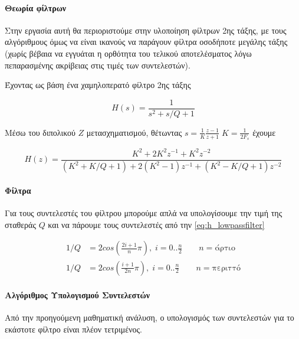 \documentclass{article}
\begin{document}
\paragraph{Θεωρία  φίλτρων}

Στην εργασία αυτή θα περιοριστούμε στην υλοποίηση φίλτρων 2ης τάξης, με τους 
αλγόριθμους όμως να είναι ικανούς να παράγουν φίλτρα οσοδήποτε μεγάλης τάξης (χωρίς 
βέβαια να εγγυάται η ορθότητα του τελικού αποτελέσματος λόγω πεπαρασμένης ακρίβειας 
στις τιμές των συντελεστών). 

Έχοντας ως βάση ένα χαμηλοπερατό φίλτρο 2ης τάξης \cite{OpenheimAlan}

\begin{equation}
    H(s) = \frac{1}{s^2 + s/Q + 1} 
    \label{eq:h_lowpassfilter}
\end{equation}

Μέσω του διπολικού $Z$ μετασχηματισμού, θέτωντας $s = \frac{1}{K}\frac{z-1}{z+1} \; K = \frac{1}{2F_s}$ έχουμε \cite{BilinearZTransformWeb}

\begin{equation}
    H(z) = \frac{K^2 + 2K^2 z^{-1} + K^2 z^{-2}}{(K^2 + K/Q + 1) + 2(K^2 - 1) z^{-1} + (K^2 - K/Q + 1) z^{-2}}
    \label{eq:h_z_final}
\end{equation}


\paragraph{Φίλτρα } 

Για τους συντελεστές του φίλτρου  μπορούμε απλά να υπολογίσουμε την τιμή 
της σταθεράς $Q$ και να πάρουμε τους συντελεστές από την \cref{eq:h_lowpassfilter} \cite{OpenheimAlan, JuceDocumentation}

\begin{align}
    1/Q &= {2cos(\frac{2i + 1}{n}\pi)}, \; i = 0..\frac{n}{2} \qquad n = {\text{άρτιο}} \\ 
    1/Q &= {2cos(\frac{i + 1}{2n}\pi)}, \; i = 0..\frac{n}{2} \qquad n = {\text{περιττό}}
\end{align}

\paragraph{Αλγόριθμος Υπολογισμού Συντελεστών}

Από την προηγούμενη μαθηματική ανάλυση, ο υπολογισμός των συντελεστών για το εκάστοτε φίλτρο είναι πλέον 
τετριμένος. 
\end{document}
